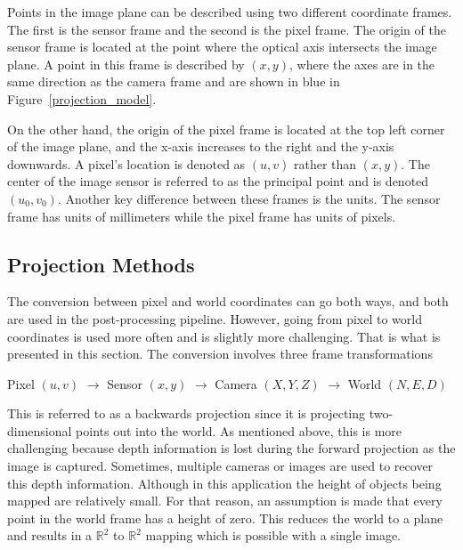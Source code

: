  Points in the image plane can be described using two different coordinate frames.  The first is the sensor frame and the second is the pixel frame.  The origin of the sensor frame is located at the point where the optical axis intersects the image plane.  A point in this frame is described by $(x,y)$, where the axes are in the same direction as the camera frame and are shown in blue in Figure~\ref{projection_model}.  
 
 On the other hand, the origin of the pixel frame is located at the top left corner of the image plane, and the x-axis increases to the right and the y-axis downwards.  A pixel's location is denoted as $(u,v)$ rather than $(x,y)$.  The center of the image sensor is referred to as the principal point and is denoted $(u_0,v_0)$. Another key difference between these frames is the units.  The sensor frame has units of millimeters while the pixel frame has units of pixels.

 \subsection{Projection Methods}

 The conversion between pixel and world coordinates can go both ways, and both are used in the post-processing pipeline.  However, going from pixel to world coordinates is used more often and is slightly more challenging. That is what is presented in this section. The conversion involves three frame transformations   
\begin{center}
 Pixel $(u,v)$ $\rightarrow$ Sensor $(x,y)$ $\rightarrow$ Camera $(X,Y,Z)$ $\rightarrow$ World $(N,E,D)$
\end{center}
 
 This is referred to as a backwards projection since it is projecting two-dimensional points out into the world.  As mentioned above, this is more challenging because depth information is lost during the forward projection as the image is captured.  Sometimes, multiple cameras or images are used to recover this depth information.  Although in this application the height of objects being mapped are relatively small.  For that reason, an assumption is made that every point in the world frame has a height of zero.  This reduces the world to a plane and results in a $\mathbb{R}^2$ to $\mathbb{R}^2$ mapping which is possible with a single image. 
 
